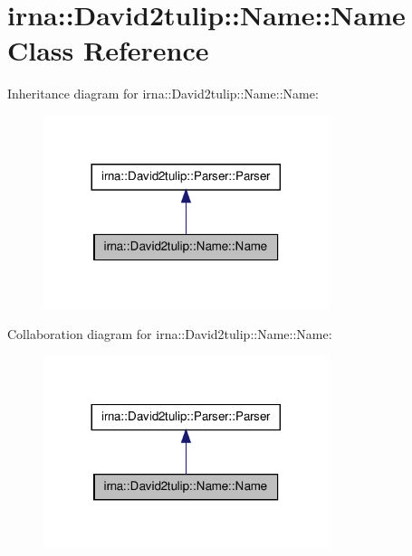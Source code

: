 \hypertarget{classirna_1_1David2tulip_1_1Name_1_1Name}{
\section{irna\-:\-:\-David2tulip\-:\-:\-Name\-:\-:\-Name \-Class \-Reference}
\label{classirna_1_1David2tulip_1_1Name_1_1Name}
}


\-Inheritance diagram for irna\-:\-:\-David2tulip\-:\-:\-Name\-:\-:\-Name\-:\nopagebreak
\begin{figure}[H]
\begin{center}
\leavevmode
\includegraphics[width=236pt]{classirna_1_1David2tulip_1_1Name_1_1Name__inherit__graph}
\end{center}
\end{figure}


\-Collaboration diagram for irna\-:\-:\-David2tulip\-:\-:\-Name\-:\-:\-Name\-:\nopagebreak
\begin{figure}[H]
\begin{center}
\leavevmode
\includegraphics[width=236pt]{classirna_1_1David2tulip_1_1Name_1_1Name__coll__graph}
\end{center}
\end{figure}
